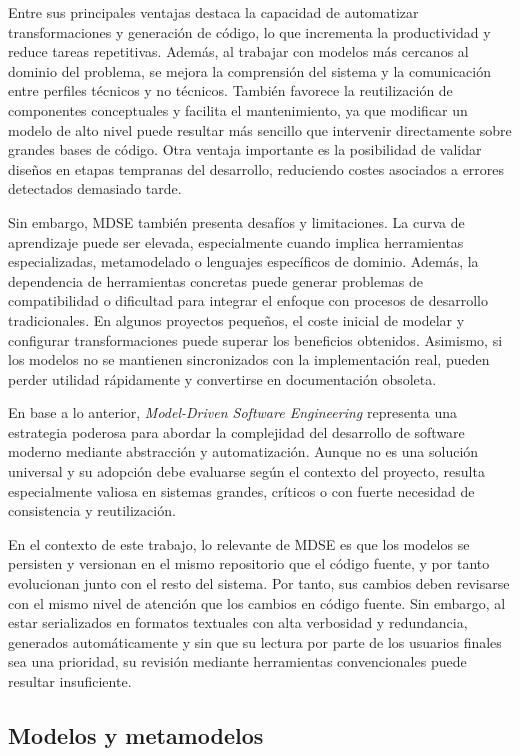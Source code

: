 \documentclass[11pt]{article}
\begin{document}
Entre sus principales ventajas destaca la capacidad de automatizar transformaciones y generación de código, lo que incrementa la productividad y reduce tareas repetitivas. Además, al trabajar con modelos más cercanos al dominio del problema, se mejora la comprensión del sistema y la comunicación entre perfiles técnicos y no técnicos. También favorece la reutilización de componentes conceptuales y facilita el mantenimiento, ya que modificar un modelo de alto nivel puede resultar más sencillo que intervenir directamente sobre grandes bases de código. Otra ventaja importante es la posibilidad de validar diseños en etapas tempranas del desarrollo, reduciendo costes asociados a errores detectados demasiado tarde.

Sin embargo, MDSE también presenta desafíos y limitaciones. La curva de aprendizaje puede ser elevada, especialmente cuando implica herramientas especializadas, metamodelado o lenguajes específicos de dominio. Además, la dependencia de herramientas concretas puede generar problemas de compatibilidad o dificultad para integrar el enfoque con procesos de desarrollo tradicionales. En algunos proyectos pequeños, el coste inicial de modelar y configurar transformaciones puede superar los beneficios obtenidos. Asimismo, si los modelos no se mantienen sincronizados con la implementación real, pueden perder utilidad rápidamente y convertirse en documentación obsoleta.

En base a lo anterior, \textit{Model-Driven Software Engineering} representa una estrategia poderosa para abordar la complejidad del desarrollo de software moderno mediante abstracción y automatización. Aunque no es una solución universal y su adopción debe evaluarse según el contexto del proyecto, resulta especialmente valiosa en sistemas grandes, críticos o con fuerte necesidad de consistencia y reutilización.

En el contexto de este trabajo, lo relevante de MDSE es que los modelos se persisten y versionan en el mismo repositorio que el código fuente, y por tanto evolucionan junto con el resto del sistema. Por tanto, sus cambios deben revisarse con el mismo nivel de atención que los cambios en código fuente. Sin embargo, al estar serializados en formatos textuales con alta verbosidad y redundancia, generados automáticamente y sin que su lectura por parte de los usuarios finales sea una prioridad, su revisión mediante herramientas convencionales puede resultar insuficiente.

\subsection{Modelos y metamodelos}
\end{document}
